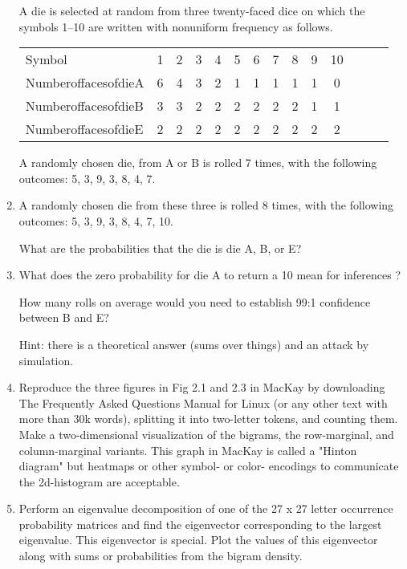 \documentclass[12pt]{book}
\theoremstyle{definition}
\begin{document}
\begin{enumerate}
A die is selected at random from three twenty-faced dice on which the symbols 1–10 are written with nonuniform frequency as follows.

\begin{tabular} {l c c c c c c c c c c c c c }
Symbol& 1& 2 &3 &4 &5 &6 &7 &8 &9 &10 \\
NumberoffacesofdieA& 6& 4 &3 &2 &1 &1 &1 &1 &1 &0  \\
NumberoffacesofdieB& 3 &3 &2 &2 &2 &2 &2 &2 &1 &1 \\
NumberoffacesofdieE& 2 &2 &2 &2 &2 &2 &2& 2& 2& 2 \\
\end{tabular}

A randomly chosen die, from A or B is rolled 7 times, with the following outcomes: 5, 3, 9, 3, 8, 4, 7.

\item 
A randomly chosen die from these three is rolled 8 times, with the following outcomes: 5, 3, 9, 3, 8, 4, 7, 10. 

What are the probabilities that the die is die A, B, or E?

\item\label{convert}

What does the zero probability for die A to return a 10 mean for inferences ? 

How many rolls on average would you need to establish 99:1 confidence between B and E? 

Hint: there is a theoretical answer (sums over things) and an attack by simulation.

\item
Reproduce the three figures in Fig 2.1 and 2.3 in MacKay by downloading The Frequently Asked Questions Manual for Linux (or any other text with more than 30k words), splitting it into two-letter tokens, and counting them.  Make a two-dimensional visualization of the bigrams, the row-marginal, and column-marginal variants.  This graph in MacKay is called a "Hinton diagram" but heatmaps or other symbol- or color- encodings to communicate the 2d-histogram are acceptable.  

\item
Perform an eigenvalue decomposition of one of the 27 x 27 letter occurrence probability matrices and find the eigenvector corresponding to the largest eigenvalue.  This eigenvector is special.  Plot the values of this eigenvector along with sums or probabilities from the bigram density.

\end{enumerate}
\end{document}
